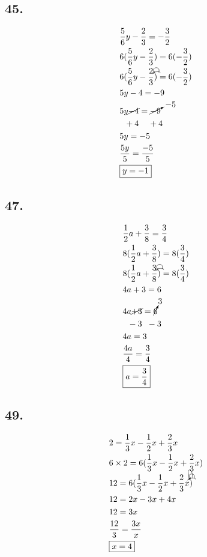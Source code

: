 \documentclass{article}
\newcommand{\tikzmark}[1]{\tikz[overlay,remember picture] \node (#1) {};}
\newcommand{\DrawBox}[2]{%
    \begin{tikzpicture}[overlay,remember picture]
        \draw[->,shorten >=5pt,shorten <=5pt,out=70,in=130,distance=0.5cm,#1] (MarkA.north) to (MarkC.north);
        \draw[->,shorten >=5pt,shorten <=5pt,out=50,in=140,distance=0.3cm,#2] (MarkA.north) to (MarkB.north);
    \end{tikzpicture}
}
\newcommand{\DrawBoxThree}[3]{%
    \begin{tikzpicture}[overlay,remember picture]
        \draw[->,shorten >=5pt,shorten <=5pt,out=70,in=130,distance=0.5cm,#1] (MarkA.north) to (MarkC.north);
        \draw[->,shorten >=5pt,shorten <=5pt,out=50,in=140,distance=0.3cm,#2] (MarkA.north) to (MarkB.north);
        \draw[->,shorten >=5pt,shorten <=5pt,out=90,in=120,distance=0.7cm,#3] (MarkA.north) to (MarkD.north);
    \end{tikzpicture}
}
\begin{document}
    \subsection*{45.}
    \begin{align*}
        & \frac{5}{6}y - \frac{2}{3} = -\frac{3}{2} \\
        & 6(\frac{5}{6}y - \frac{2}{3}) = 6(-\frac{3}{2}) \\
        & 6\tikzmark{MarkA} (\frac{5}{6}y\tikzmark{MarkB} - \frac{2}{3}\tikzmark{MarkC})\DrawBox{black}{black} = 6(-\frac{3}{2}) \\
        & 5y - 4 = -9 \\
        & 5y \cancel{- 4} = \cancelto{-5}{- 9} \\
        & \hspace{.2cm}+ 4 \hspace{.4cm} + 4 \\
        & 5y = -5\\
        & \frac{5y}{5} = \frac{-5}{5} \\
        & \boxed{y = -1}
    \end{align*}

    \subsection*{47.}
    \begin{align*}
        & \frac{1}{2}a + \frac{3}{8} = \frac{3}{4} \\
        & 8(\frac{1}{2}a + \frac{3}{8}) = 8(\frac{3}{4}) \\
        & 8\tikzmark{MarkA} (\frac{1}{2}a\tikzmark{MarkB} + \frac{3}{8}\tikzmark{MarkC})\DrawBox{black}{black} = 8(\frac{3}{4}) \\
        & 4a + 3 = 6 \\
        & 4a \cancel{+ 3} = \cancelto{3}{6} \\
        & \hspace{.2cm}- 3 \hspace{.2cm} - 3 \\
        & 4a = 3\\
        & \frac{4a}{4} = \frac{3}{4} \\
        & \boxed{a = \frac{3}{4}}
    \end{align*}

    \subsection*{49.}
    \begin{align*}
        & 2 = \frac{1}{3}x - \frac{1}{2}x + \frac{2}{3}x \\
        & 6 \times 2 = 6(\frac{1}{3}x - \frac{1}{2}x + \frac{2}{3}x) \\
        & 12 = 6\tikzmark{MarkA}(\frac{1}{3}x\tikzmark{MarkB} - \frac{1}{2}x\tikzmark{MarkC} + \frac{2}{3}x\tikzmark{MarkD})\DrawBoxThree{black}{black}{black} \\
        & 12 = 2x - 3x + 4x  \\
        & 12 = 3x \\
        & \frac{12}{3} = \frac{3x}{x} \\
        & \boxed{x = 4}
    \end{align*}
\end{document}
